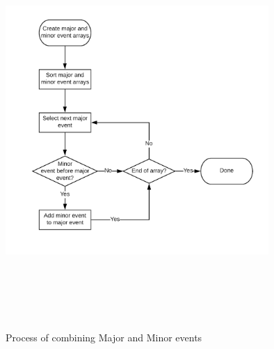 \begin{figure}
    \begin{centering}
        \includegraphics[width=10cm,height=15cm,keepaspectratio]{Figures/Chapter5-CombiningMajorMinor.png}
        \caption{Process of combining Major and Minor events}
        \label{fig:chapter5CombineMajorMinor}
    \end{centering}
\end{figure}

